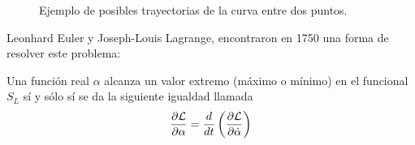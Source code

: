 \begin{figure}[H]
	\centering
	\caption{Ejemplo de posibles trayectorias de la curva entre dos puntos.}\label{pic:braquistocrona}
\end{figure}

Leonhard Euler y Joseph-Louis Lagrange, encontraron en 1750 una forma de resolver este problema:
\begin{theorem}
	Una función real $\alpha$ alcanza un valor extremo (máximo o mínimo) en el funcional $S_L$ sí y sólo sí se da la siguiente igualdad llamada 
	\begin{equation}
		\label{eq:euler-lagrange}
		\frac{\partial \mathcal{L}}{\partial \alpha}=\frac{d}{dt}\left( \frac{\partial \mathcal{L}}{\partial \dot{\alpha}} \right)
	\end{equation}
\end{theorem}
